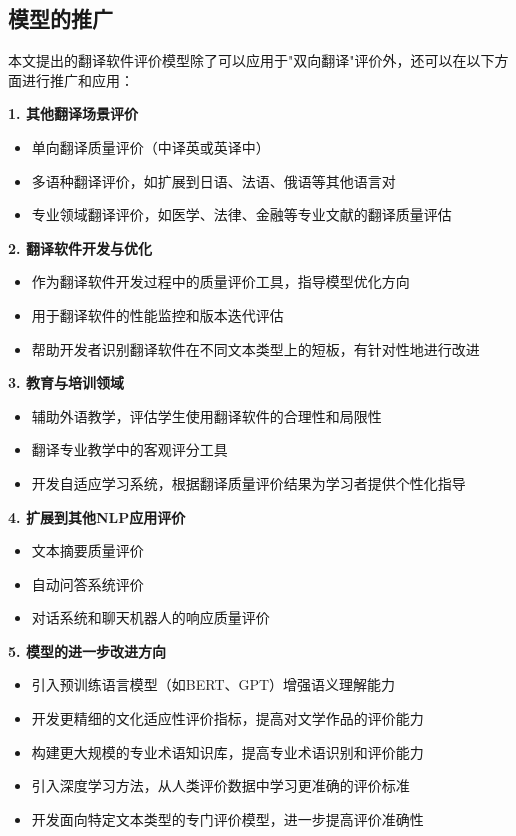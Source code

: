 \documentclass[bwprint]{cumcmthesis}
\begin{document}
\subsection{模型的推广}
本文提出的翻译软件评价模型除了可以应用于"双向翻译"评价外，还可以在以下方面进行推广和应用：

\textbf{1. 其他翻译场景评价}
\begin{itemize}
    \item 单向翻译质量评价（中译英或英译中）
    \item 多语种翻译评价，如扩展到日语、法语、俄语等其他语言对
    \item 专业领域翻译评价，如医学、法律、金融等专业文献的翻译质量评估
\end{itemize}

\textbf{2. 翻译软件开发与优化}
\begin{itemize}
    \item 作为翻译软件开发过程中的质量评价工具，指导模型优化方向
    \item 用于翻译软件的性能监控和版本迭代评估
    \item 帮助开发者识别翻译软件在不同文本类型上的短板，有针对性地进行改进
\end{itemize}

\textbf{3. 教育与培训领域}
\begin{itemize}
    \item 辅助外语教学，评估学生使用翻译软件的合理性和局限性
    \item 翻译专业教学中的客观评分工具
    \item 开发自适应学习系统，根据翻译质量评价结果为学习者提供个性化指导
\end{itemize}

\textbf{4. 扩展到其他NLP应用评价}
\begin{itemize}
    \item 文本摘要质量评价
    \item 自动问答系统评价
    \item 对话系统和聊天机器人的响应质量评价
\end{itemize}

\textbf{5. 模型的进一步改进方向}
\begin{itemize}
    \item 引入预训练语言模型（如BERT、GPT）增强语义理解能力
    \item 开发更精细的文化适应性评价指标，提高对文学作品的评价能力
    \item 构建更大规模的专业术语知识库，提高专业术语识别和评价能力
    \item 引入深度学习方法，从人类评价数据中学习更准确的评价标准
    \item 开发面向特定文本类型的专门评价模型，进一步提高评价准确性
\end{itemize}
\end{document}
